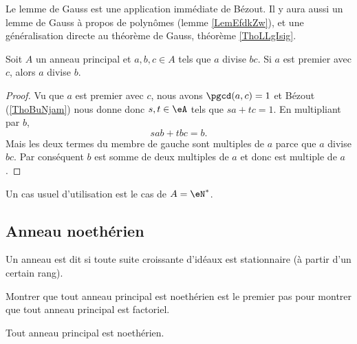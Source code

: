 Le lemme de Gauss est une application immédiate de Bézout. Il y aura aussi un lemme de Gauss à propos de polynômes (lemme \ref{LemEfdkZw}), et une généralisation directe au théorème de Gauss, théorème \ref{ThoLLgIsig}.
\begin{lemma}    \label{LemSdnZNX}
    Soit \( A\) un anneau principal et \( a,b,c\in A\) tels que \( a\) divise \( bc\). Si \( a\) est premier avec \( c\), alors \( a\) divise \( b\).
\end{lemma}

\begin{proof}
    Vu que \( a\) est premier avec \( c\), nous avons \( \pgcd(a,c)=1\) et Bézout (\ref{ThoBuNjam}) nous donne donc \( s,t\in \eA\) tels que \( sa+tc=1\). En multipliant par \( b\),
    \begin{equation}
        sab+tbc=b.
    \end{equation}
    Mais les deux termes du membre de gauche sont multiples de \( a\) parce que \( a\) divise \( bc\). Par conséquent \( b\) est somme de deux multiples de \( a\) et donc est multiple de \( a\).
\end{proof}
Un cas usuel d'utilisation est le cas de \( A=\eN^*\).

\subsection{Anneau noethérien}

\begin{definition}
    Un anneau est dit  si toute suite croissante d'idéaux est stationnaire (à partir d'un certain rang). 
\end{definition}

Montrer que tout anneau principal est noethérien est le premier pas pour montrer que tout anneau principal est factoriel.

\begin{lemma}
    Tout anneau principal est noethérien.
\end{lemma}

